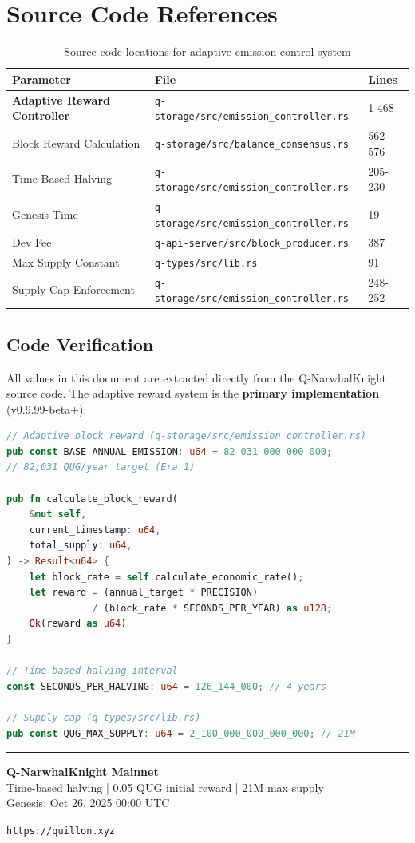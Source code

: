 \documentclass[11pt,a4paper]{article}
\begin{document}
\section{Source Code References}

\begin{table}[h]
\centering
\small
\begin{tabular}{lll}
\toprule
\textbf{Parameter} & \textbf{File} & \textbf{Lines} \\
\midrule
\textbf{Adaptive Reward Controller} & \texttt{q-storage/src/emission\_controller.rs} & 1-468 \\
Block Reward Calculation & \texttt{q-storage/src/balance\_consensus.rs} & 562-576 \\
Time-Based Halving & \texttt{q-storage/src/emission\_controller.rs} & 205-230 \\
Genesis Time & \texttt{q-storage/src/emission\_controller.rs} & 19 \\
Dev Fee & \texttt{q-api-server/src/block\_producer.rs} & 387 \\
Max Supply Constant & \texttt{q-types/src/lib.rs} & 91 \\
Supply Cap Enforcement & \texttt{q-storage/src/emission\_controller.rs} & 248-252 \\
\bottomrule
\end{tabular}
\caption{Source code locations for adaptive emission control system}
\end{table}

\subsection{Code Verification}

All values in this document are extracted directly from the Q-NarwhalKnight source code. The adaptive reward system is the \textbf{primary implementation} (v0.9.99-beta+):

\begin{lstlisting}[language=Rust]
// Adaptive block reward (q-storage/src/emission_controller.rs)
pub const BASE_ANNUAL_EMISSION: u64 = 82_031_000_000_000;
// 82,031 QUG/year target (Era 1)

pub fn calculate_block_reward(
    &mut self,
    current_timestamp: u64,
    total_supply: u64,
) -> Result<u64> {
    let block_rate = self.calculate_economic_rate();
    let reward = (annual_target * PRECISION)
               / (block_rate * SECONDS_PER_YEAR) as u128;
    Ok(reward as u64)
}

// Time-based halving interval
const SECONDS_PER_HALVING: u64 = 126_144_000; // 4 years

// Supply cap (q-types/src/lib.rs)
pub const QUG_MAX_SUPPLY: u64 = 2_100_000_000_000_000; // 21M
\end{lstlisting}

\vfill

\begin{center}
\rule{0.8\textwidth}{0.4pt}

\textbf{Q-NarwhalKnight Mainnet} \\
\vspace{0.2cm}
\small Time-based halving | 0.05 QUG initial reward | 21M max supply \\
Genesis: Oct 26, 2025 00:00 UTC

\vspace{0.3cm}
\texttt{https://quillon.xyz}
\end{center}
\end{document}
